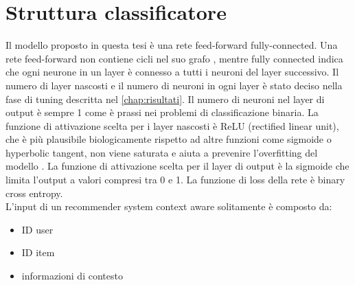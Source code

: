 \documentclass[12pt,italian]{report}
\begin{document}
\section{Struttura classificatore}
Il modello proposto in questa tesi è una rete feed-forward fully-connected. Una rete feed-forward non contiene cicli nel suo grafo \cite{Goodfellow-et-al-2016}, mentre fully connected indica che ogni neurone in un layer è connesso a tutti i neuroni del layer successivo. Il numero di layer nascosti e il numero di neuroni in ogni layer è stato deciso nella fase di tuning descritta nel \autoref{chap:risultati}.
Il numero di neuroni nel layer di output è sempre 1 come è prassi nei problemi di classificazione binaria. La funzione di attivazione scelta per i layer nascosti è ReLU (rectified linear unit), che è più plausibile biologicamente rispetto ad altre funzioni come sigmoide o hyperbolic tangent, non viene saturata e aiuta a prevenire l'overfitting del modello \cite{rectifier-neural-networks}. La funzione di attivazione scelta per il layer di output è la sigmoide che limita l'output a valori compresi tra 0 e 1. La funzione di loss della rete è binary cross entropy. \\

L'input di un recommender system context aware solitamente è composto da:
\begin{itemize}
	\item ID user
	\item ID item
	\item informazioni di contesto
\end{itemize}
\end{document}
